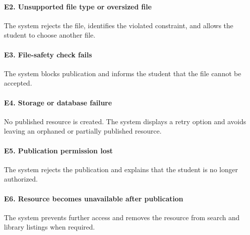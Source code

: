 \documentclass[12pt]{article}
\begin{document}
\paragraph*{E2. Unsupported file type or oversized file}
\par\medskip
The system rejects the file, identifies the violated constraint, and allows the student to choose another file.
\par\medskip
\hypertarget{sec:e3-file-safety-check-fails}{}
\paragraph*{E3. File-safety check fails}
\par\medskip
The system blocks publication and informs the student that the file cannot be accepted.
\par\medskip
\hypertarget{sec:e4-storage-or-database-failure}{}
\paragraph*{E4. Storage or database failure}
\par\medskip
No published resource is created. The system displays a retry option and avoids leaving an orphaned or partially published resource.
\par\medskip
\hypertarget{sec:e5-publication-permission-lost}{}
\paragraph*{E5. Publication permission lost}
\par\medskip
The system rejects the publication and explains that the student is no longer authorized.
\par\medskip
\hypertarget{sec:e6-resource-becomes-unavailable-after-publication}{}
\paragraph*{E6. Resource becomes unavailable after publication}
\par\medskip
The system prevents further access and removes the resource from search and library listings when required.
\par\medskip
\hypertarget{sec:6-4-3-business-rules}{}
\end{document}

